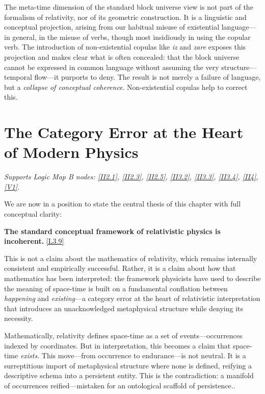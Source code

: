 \documentclass[12pt]{book}
\newcounter{logicanchor}
\newenvironment{logicanchorenv}[1]{\refstepcounter{logicanchor}\label{#1}}{}
\newcommand{\logiclink}[2]{\begin{logicanchorenv}{logic:#1}\end{logicanchorenv}\hyperref[appendix:#1]{[#1]}\xspace}
\begin{document}
The meta-time dimension of the standard block universe view is not part of the formalism of relativity, nor of its geometric construction. It is a linguistic and conceptual projection, arising from our habitual misuse of existential language---in general, in the misuse of verbs, though most insidiously in using the copular verb. The introduction of non-existential copulas like \textit{iz} and \textit{zare} exposes this projection and makes clear what is often concealed: that the block universe cannot be expressed in common language without assuming the very structure---temporal flow---it purports to deny. The result is not merely a failure of language, but a \textit{collapse of conceptual coherence}. Non-existential copulas help to correct this. 

\section{The Category Error at the Heart of Modern Physics}\label{sec:3.5}
\noindent\textit{Supports Logic Map B nodes: \hyperref[appendix:II2.1]{[II2.1]}, \hyperref[appendix:II2.3]{[II2.3]}, \hyperref[appendix:II2.5]{[II2.5]}, \hyperref[appendix:II3.2]{[II3.2]}, \hyperref[appendix:II3.3]{[II3.3]}, \hyperref[appendix:II3.4]{[II3.4]}, \hyperref[appendix:II4]{[II4]}, \hyperref[appendix:V1]{[V1]}.}

\vspace{4pt}

We are now in a position to state the central thesis of this chapter with full conceptual clarity:

\textbf{The standard conceptual framework of relativistic physics is incoherent.} \logiclink{L3.9}{}

This is not a claim about the mathematics of relativity, which remains internally consistent and empirically successful. Rather, it is a claim about how that mathematics has been interpreted: the framework physicists have used to describe the meaning of space-time is built on a fundamental conflation between \textit{happening} and \textit{existing}---a category error at the heart of relativistic interpretation that introduces an unacknowledged metaphysical structure while denying its necessity.

Mathematically, relativity defines space-time as a set of events---occurrences indexed by coordinates. But in interpretation, this becomes a claim that space-time \textit{exists}. This move---from occurrence to endurance---is not neutral. It is a surreptitious import of metaphysical structure where none is defined, reifying a descriptive schema into a persistent entity. This is the contradiction: a manifold of occurrences reified---mistaken for an ontological scaffold of persistence..
\end{document}
